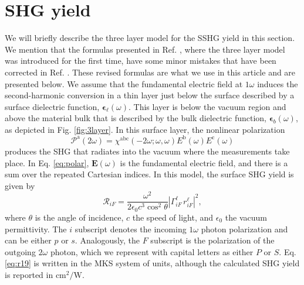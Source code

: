 \documentclass[prb,superscriptaddress,showpacs,twocolumn,letterpaper]{revtex4}
\begin{document}
\section{SHG yield}\label{sec:yield}

We will briefly describe the three layer model for the SSHG yield in this
section. We mention that the formulas presented in Ref. ,
where the three layer model was introduced for the first time, have some minor
mistakes that have been corrected in Ref. . These
revised formulas are what we use in this article and are presented below. We
assume that the fundamental electric field at $1\omega$ induces the
second-harmonic conversion in a thin layer just below the surface described by a
surface dielectric function, $\boldsymbol{\epsilon}_{\ell}(\omega)$. This layer
is below the vacuum region and above the material bulk that is described by the
bulk dielectric function, $\boldsymbol{\epsilon}_b(\omega)$, as depicted in Fig.
\ref{fig:3layer}. In this surface layer, the nonlinear polarization
\begin{equation}\label{eq:polar}
\mathcal{P}^{\mathrm{a}}(2\omega) = 
\chi^{\mathrm{abc}}(-2\omega;\omega,\omega)
E^{\mathrm{b}}(\omega)E^{\mathrm{c}}(\omega)
\end{equation}
produces the SHG that radiates into the vacuum where the measurements take
place. In Eq. \eqref{eq:polar}, $\mathbf{E}(\omega)$ is the fundamental electric
field, and there is a sum over the repeated Cartesian indices. In this model, the
surface SHG yield is given by\cite{anderson2016}
\begin{equation}\label{eq:r19}
\mathcal{R}_{iF}=
\frac{\omega^{2}}{2\epsilon_{0}c^{3}\cos^{2}\theta}
\left|\Gamma^{\ell}_{iF}\,r^{\ell}_{iF}\right|^2,
\end{equation}
where $\theta$ is the angle of incidence, $c$ the speed of light, and
$\epsilon_{0}$ the vacuum permittivity. The $i$ subscript denotes the incoming
$1\omega$ photon polarization and can be either $p$ or $s$. Analogously, the $F$
subscript is the polarization of the outgoing $2\omega$ photon, which we
represent with capital letters as either $P$ or $S$. Eq. \eqref{eq:r19} is
written in the MKS system of units, although the calculated SHG yield is
reported in $\text{cm}^{2}/\text{W}$.
\end{document}
